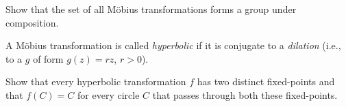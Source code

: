 \documentclass[bbb]{report}
\begin{document}
\begin{large}
\begin{description}
{\item[\quad (i)] Show that the set of all M\"obius transformations 
forms a group under composition.

\vspace{.25in}

A M\"obius transformation is called {\it hyperbolic} if it is 
conjugate to a {\it dilation} (i.e., to a $g$ of form 
$g(z)=rz$, $r>0$).

\item[\quad (ii)] Show that every hyperbolic transformation $f$ has 
two distinct fixed-points and that $f(C)=C$ for every circle $C$ 
that passes through both these fixed-points.





}
\end{description}

\end{large}
\end{document}
